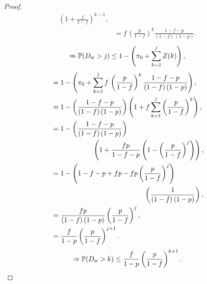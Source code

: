 \begin{proof}
\begin{align*}
\left(1+ \frac{f}{1 - f} \right)^{k-1},\\
&=f\,\left( \frac{p}{1 - f} \right)^{k}
\frac{1-f-p}{(1 - f) \, (1 - p)}.
\end{align*}
\begin{equation*}
 \Rightarrow\mathbb{P}(D_{\mathrm{w}} >j) \leq 1-\left(\pi_0+\sum_{k=1}^{j}Z(k)\right),  
\end{equation*}
\begin{align*}
&=1-\left(\pi_0+\sum_{k=1}^{j}f\,\left( \frac{p}{1 - f} \right)^{k}
\frac{1-f-p}{(1 - f) \, (1 - p)}\right),\\
 &= 1-\left(\frac{1-f-p}{(1 - f) \, (1 - p)}\right)\left(1 + f\sum_{k=1}^{j}\left( \frac{p}{1 - f} \right)^{k}\right),\\
 &= 1-\left(\frac{1-f-p}{(1 - f) \, (1 - p)}\right)\\&\hspace{6em}\left(1 + \frac{fp}{1-f-p}\left(1-\left(\frac{p}{1-f}\right)^j\right)\right),\\
&= 1-\left(1-f-p+fp-fp\left(\frac{p}{1-f}\right)^j\right)\\&\hspace{13.5em}\left(\frac{1}{(1 - f) \, (1 - p)}\right),\\
&=\frac{fp}{(1-f)\,(1-p)}\left(\frac{p}{1-f}\right)^j,\\
&=\frac{f}{1-p}\left(\frac{p}{1-f}\right)^{j+1}.
\end{align*}
\begin{equation}
    \Rightarrow\mathbb{P}(D_{\mathrm{w}} >k) \leq\frac{f}{1-p}\left(\frac{p}{1-f}\right)^{k+1}.\nonumber
\end{equation}
\end{proof}

